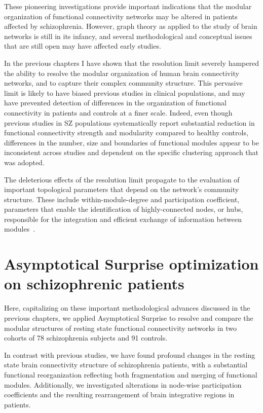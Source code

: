 These pioneering investigations provide important indications that the modular organization of functional connectivity networks may be altered in patients affected by schizophrenia.
However, graph theory as applied to the study of brain networks is still in its infancy, and several methodological and conceptual issues that are still open may have affected early studies.

In the previous chapters I have shown that the resolution limit severely hampered the ability to resolve the modular organization of human brain connectivity networks, and to capture their complex community structure.
This pervasive limit is likely to have biased previous studies in clinical populations, and may have prevented detection of differences in the organization of functional connectivity in patients and controls at a finer scale.
Indeed, even though previous studies in SZ populations systematically report substantial reduction in functional connectivity strength and modularity compared to healthy controls, differences in the number, size and boundaries of functional modules appear to be inconsistent across studies and dependent on the specific clustering approach that was adopted.

The deleterious effects of the resolution limit propagate to the evaluation of important topological parameters that depend on the network's community structure.
These include within-module-degree and participation coefficient, parameters that enable the identification of highly-connected nodes, or hubs, responsible for the integration and efficient exchange of information between modules~\cite{bullmore2009}.

\section{Asymptotical Surprise optimization on schizophrenic patients}
Here, capitalizing on these important methodological advances discussed in the previous chapters, we applied Asymptotical Surprise to resolve and compare the modular structures of resting state functional connectivity networks in two cohorts of 78 schizophrenia subjects and 91 controls.

In contrast with previous studies, we have found profound changes in the resting state brain connectivity structure of schizophrenia patients, with a substantial functional reorganization reflecting both fragmentation and merging of functional modules.
Additionally, we investigated alterations in node-wise participation coefficients and the resulting rearrangement of brain integrative regions in patients.

